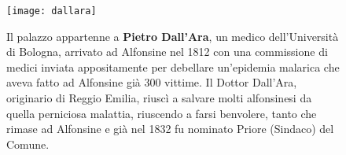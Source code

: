  \begin{figure}[htb]
    \centering
    \texttt{[image: dallara]}
    \caption*{Il palazzo appartenne a \textbf{Pietro Dall'Ara}, un medico dell'Università di Bologna, arrivato ad Alfonsine nel 1812 con una commissione di medici inviata appositamente per debellare un'epidemia malarica che aveva fatto ad Alfonsine già 300 vittime. Il Dottor Dall'Ara, originario di Reggio Emilia, riuscì a salvare molti alfonsinesi da quella perniciosa malattia, riuscendo a farsi benvolere, tanto che rimase ad Alfonsine e già nel 1832 fu nominato Priore (Sindaco) del Comune.\label{fig:dallara}}
\end{figure}












































%